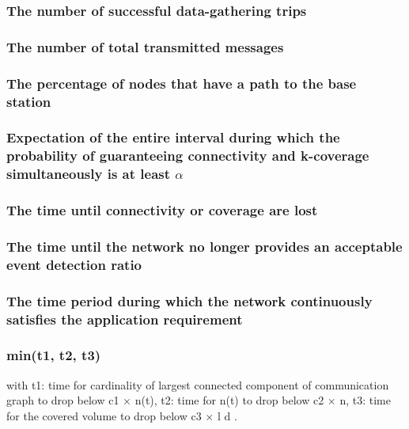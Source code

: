 \subsubsection{The number of successful data-gathering trips}
\subsubsection{The number of total transmitted messages }
\subsubsection{The percentage of nodes that have a path to the base station}
\subsubsection{Expectation of the entire interval during which the probability of guaranteeing connectivity and k-coverage simultaneously is at least $\alpha$}
\subsubsection{The time until connectivity or coverage are lost}
\subsubsection{The time until the network no longer provides an acceptable event detection ratio}
\subsubsection{The time period during which the network continuously satisfies the application requirement}
\subsubsection{min(t1, t2, t3)}
with t1: time for cardinality of largest connected component of
communication graph to drop below c1 $\times$ n(t), t2: time for n(t) to drop below c2 $\times$ n, t3:
time for the covered volume to drop below c3 $\times$ l d .
